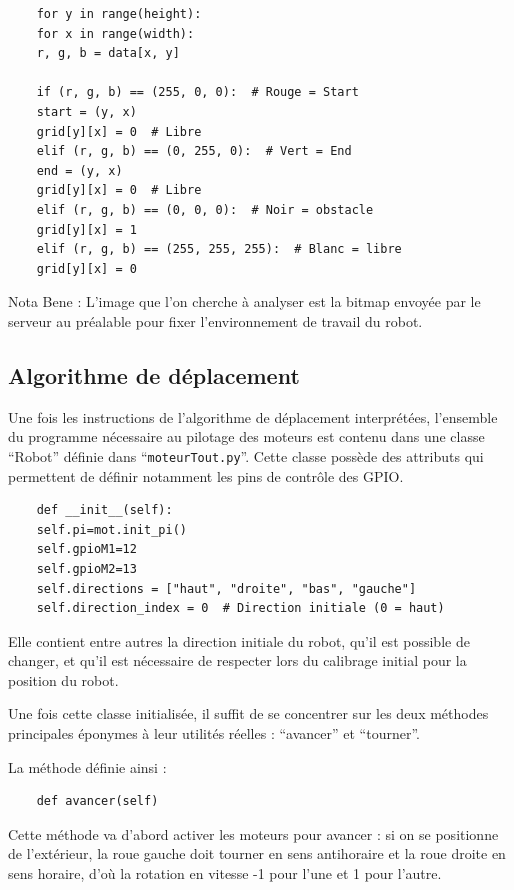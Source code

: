 \documentclass[a4paper,12pt]{report}  %
\begin{document}
\begin{lstlisting}
	for y in range(height):
	for x in range(width):
	r, g, b = data[x, y]
	
	if (r, g, b) == (255, 0, 0):  # Rouge = Start
	start = (y, x)
	grid[y][x] = 0  # Libre
	elif (r, g, b) == (0, 255, 0):  # Vert = End
	end = (y, x)
	grid[y][x] = 0  # Libre
	elif (r, g, b) == (0, 0, 0):  # Noir = obstacle
	grid[y][x] = 1
	elif (r, g, b) == (255, 255, 255):  # Blanc = libre
	grid[y][x] = 0
\end{lstlisting}


Nota Bene : L’image que l’on cherche à analyser est la bitmap envoyée par le serveur au préalable pour fixer l’environnement de travail du robot.

\subsection{Algorithme de déplacement}

Une fois les instructions de l’algorithme de déplacement interprétées, l’ensemble du programme nécessaire au pilotage des moteurs est contenu dans une classe “Robot” définie dans “\texttt{moteurTout.py}”. Cette classe possède des attributs qui permettent de définir notamment les pins de contrôle des GPIO.

\begin{lstlisting}
	def __init__(self):
	self.pi=mot.init_pi()
	self.gpioM1=12
	self.gpioM2=13
	self.directions = ["haut", "droite", "bas", "gauche"]
	self.direction_index = 0  # Direction initiale (0 = haut)
\end{lstlisting}

Elle contient entre autres la direction initiale du robot, qu’il est possible de changer, et qu’il est nécessaire de respecter lors du calibrage initial pour la position du robot.

Une fois cette classe initialisée, il suffit de se concentrer sur les deux méthodes principales éponymes à leur utilités réelles : “avancer” et “tourner”.

La méthode définie ainsi : 
\begin{lstlisting}
	def avancer(self)
\end{lstlisting}

Cette méthode va d’abord activer les moteurs pour avancer : si on se positionne de l’extérieur, la roue gauche doit tourner en sens antihoraire et la roue droite en sens horaire, d’où la rotation en vitesse -1 pour l’une et 1 pour l’autre.
\end{document}

